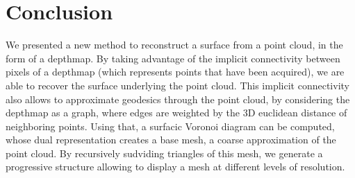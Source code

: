 
\section{Conclusion}

We presented a new method to reconstruct a surface from a point cloud, in the form of a depthmap. 
By taking advantage of the implicit connectivity between pixels of a depthmap (which represents points that have been acquired), we are able to recover the surface underlying the point cloud.
This implicit connectivity also allows to approximate geodesics through the point cloud, by considering the depthmap as a graph, where edges are weighted by the 3D euclidean distance of neighboring points.
Using that, a surfacic Voronoi diagram can be computed, whose dual representation creates a base mesh, a coarse approximation of the point cloud.
By recursively sudviding triangles of this mesh, we generate a progressive structure allowing to display a mesh at different levels of resolution.